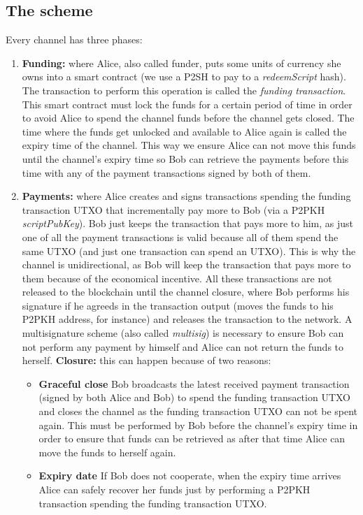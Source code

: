 \documentclass[12pt,journal,compsoc]{IEEEtran}
\begin{document}
\subsection{The scheme}
Every channel has three phases:
\begin{enumerate}
    \item \textbf{Funding:} where Alice, also called funder, puts some units of currency she owns into a smart contract (we use a P2SH to pay to a \textit{redeemScript} hash). The transaction to perform this operation is called the \textit{funding transaction}. This smart contract must lock the funds for a certain period of time in order to avoid Alice to spend the channel funds before the channel gets closed. The time where the funds get unlocked and available to Alice again is called the expiry time of the channel. This way we ensure Alice can not move this funds until the channel's expiry time so Bob can retrieve the payments before this time with any of the payment transactions signed by both of them.
    \item \textbf{Payments:} where Alice creates and signs transactions spending the funding transaction UTXO that incrementally pay more to Bob (via a P2PKH \textit{scriptPubKey}). Bob just keeps the transaction that pays more to him, as just one of all the payment transactions is valid because all of them spend the same UTXO (and just one transaction can spend an UTXO). This is why the channel is unidirectional, as Bob will keep the transaction that pays more to them because of the economical incentive. All these transactions are not released to the blockchain until the channel closure, where Bob performs his signature if he agreeds in the transaction output (moves the funds to his P2PKH address, for instance) and releases the transaction to the network. A multisignature scheme (also called \textit{multisig})\cite{bitcoin-wiki-multisig:online} is necessary to ensure Bob can not perform any payment by himself and Alice can not return the funds to herself.
    \textbf{Closure:} this can happen because of two reasons:
    \begin{itemize}
        \item \textbf{Graceful close} Bob broadcasts the latest received payment transaction (signed by both Alice and Bob) to spend the funding transaction UTXO and closes the channel as the funding transaction UTXO can not be spent again. This must be performed by Bob before the channel's expiry time in order to ensure that funds can be retrieved as after that time Alice can move the funds to herself again.
        \item \textbf{Expiry date} If Bob does not cooperate, when the expiry time arrives Alice can safely recover her funds just by performing a P2PKH transaction spending the funding transaction UTXO.
    \end{itemize}
\end{enumerate} 
\end{document}
